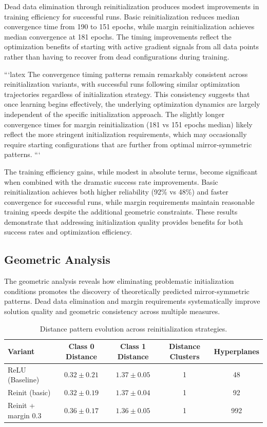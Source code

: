 Dead data elimination through reinitialization produces modest improvements in training efficiency for successful runs. Basic reinitialization reduces median convergence time from 190 to 151 epochs, while margin reinitialization achieves median convergence at 181 epochs. The timing improvements reflect the optimization benefits of starting with active gradient signals from all data points rather than having to recover from dead configurations during training.

```latex
The convergence timing patterns remain remarkably consistent across reinitialization variants, with successful runs following similar optimization trajectories regardless of initialization strategy. This consistency suggests that once learning begins effectively, the underlying optimization dynamics are largely independent of the specific initialization approach. The slightly longer convergence times for margin reinitialization (181 vs 151 epochs median) likely reflect the more stringent initialization requirements, which may occasionally require starting configurations that are further from optimal mirror-symmetric patterns.
```

The training efficiency gains, while modest in absolute terms, become significant when combined with the dramatic success rate improvements. Basic reinitialization achieves both higher reliability (92\% vs 48\%) and faster convergence for successful runs, while margin requirements maintain reasonable training speeds despite the additional geometric constraints. These results demonstrate that addressing initialization quality provides benefits for both success rates and optimization efficiency.


\subsection*{Geometric Analysis}

The geometric analysis reveals how eliminating problematic initialization conditions promotes the discovery of theoretically predicted mirror-symmetric patterns. Dead data elimination and margin requirements systematically improve solution quality and geometric consistency across multiple measures.

\begin{table}[ht]
\centering
\caption{Distance pattern evolution across reinitialization strategies.}
\label{tab:relu1-reinit-distance}
\begin{tabular}{lcccc}
\toprule
Variant & Class 0 Distance & Class 1 Distance & Distance Clusters & Hyperplanes \\
\midrule
ReLU (Baseline) & $0.32 \pm 0.21$ & $1.37 \pm 0.05$ & 1 & 48 \\
Reinit (basic) & $0.32 \pm 0.19$ & $1.37 \pm 0.04$ & 1 & 92 \\
Reinit + margin 0.3 & $0.36 \pm 0.17$ & $1.36 \pm 0.05$ & 1 & 992 \\
\bottomrule
\end{tabular}
\end{table}

